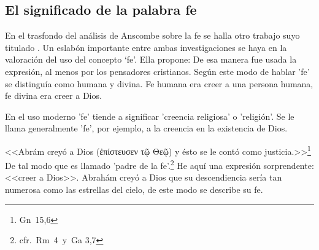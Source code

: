 \subsection{El significado de la palabra fe}

En el trasfondo del análisis de Anscombe sobre la fe se halla otro trabajo suyo titulado . 
Un eslabón importante entre ambas investigaciones se haya en la valoración del uso del concepto `fe'. 
Ella propone: 
 De esa manera fue usada la expresión, al menos por los pensadores cristianos. 
Según este modo de hablar 'fe' se distinguía como humana y divina. Fe humana era creer a una persona humana, fe divina era creer a Dios.

En el uso moderno 'fe' tiende a significar 'creencia religiosa' o 'religión'. Se le llama generalmente 'fe', por ejemplo, a la creencia en la existencia de Dios. 

<<Abrám creyó a Dios (\textgreek{ἐπίστευσεν τῷ Θεῷ}) y ésto se le contó como justicia.>>\footnote{Gn~15,6} De tal modo que es llamado 'padre de la fe'.\footnote{cfr.~Rm~4~y~Ga 3,7} He aquí una expresión sorprendente: <<creer a Dios>>. Abrahám creyó a Dios que su descendiencia sería tan numerosa como las estrellas del cielo, de este modo se describe su fe.
